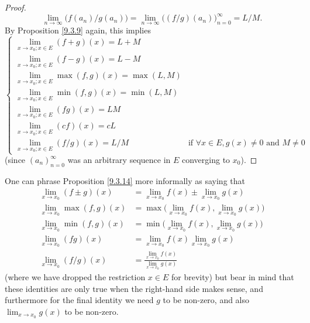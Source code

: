 \begin{proof}
    \[
        \lim_{n \to \infty} \big(f(a_n) / g(a_n)\big) = \lim_{n \to \infty} \big((f / g)(a_n)\big)_{n = 0}^\infty = L / M.
    \]
    By Proposition \ref{9.3.9} again, this implies
    \[
        \begin{cases}
            \lim_{x \to x_0 ; x \in E} (f + g)(x) = L + M                                                                 \\
            \lim_{x \to x_0 ; x \in E} (f - g)(x) = L - M                                                                 \\
            \lim_{x \to x_0 ; x \in E} \max(f, g)(x) = \max(L, M)                                                         \\
            \lim_{x \to x_0 ; x \in E} \min(f, g)(x) = \min(L, M)                                                         \\
            \lim_{x \to x_0 ; x \in E} (fg)(x) = LM                                                                       \\
            \lim_{x \to x_0 ; x \in E} (cf)(x) = cL                                                                       \\
            \lim_{x \to x_0 ; x \in E} (f / g)(x) = L / M & \text{if } \forall x \in E, g(x) \neq 0 \text{ and } M \neq 0
        \end{cases}
    \]
    (since \((a_n)_{n = 0}^\infty\) was an arbitrary sequence in \(E\) converging to \(x_0\)).
\end{proof}

\begin{remark}\label{9.3.15}
    One can phrase Proposition \ref{9.3.14} more informally as saying that
    \begin{align*}
        \lim_{x \to x_0} (f \pm g)(x)  & = \lim_{x \to x_0} f(x) \pm \lim_{x \to x_0} g(x)              \\
        \lim_{x \to x_0} \max(f, g)(x) & = \max\bigg(\lim_{x \to x_0} f(x), \lim_{x \to x_0} g(x)\bigg) \\
        \lim_{x \to x_0} \min(f, g)(x) & = \min\bigg(\lim_{x \to x_0} f(x), \lim_{x \to x_0} g(x)\bigg) \\
        \lim_{x \to x_0} (fg)(x)       & = \lim_{x \to x_0} f(x) \lim_{x \to x_0} g(x)                  \\
        \lim_{x \to x_0} (f / g)(x)    & = \frac{\lim_{x \to x_0} f(x)}{\lim_{x \to x_0} g(x)}
    \end{align*}
    (where we have dropped the restriction \(x \in E\) for brevity)
    but bear in mind that these identities are only true when the right-hand side makes sense, and furthermore for the final identity we need \(g\) to be non-zero, and also \(\lim_{x \to x_0} g(x)\) to be non-zero.
\end{remark}

